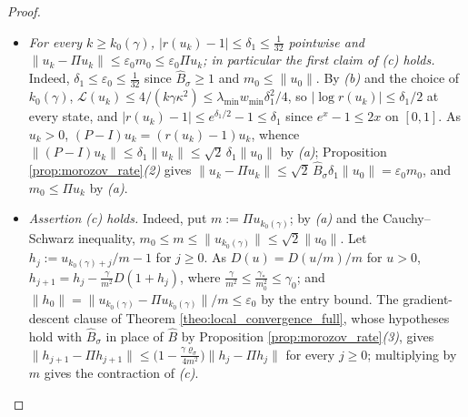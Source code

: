 \begin{proof}
\begin{itemize}
\begin{eqnarray*}
        \|D(u_k)\|\;\geq\;|\Pi D(u_k)|&=&\int\bigl|g'(r(u_k))\bigl(1-r(u_k)\bigr)\bigr|\,\frac w{u_k}\,d\lambda\\
        &\geq&\frac{w_{\min}}{M\max u_k}\int g(r(u_k))\,d\lambda\;\geq\;\frac\kappa{\sqrt2}\,\mathcal L(u_k).
    \end{eqnarray*}
    With \emph{(a)}, $\mathcal L(u_{k+1})\leq\mathcal L(u_k)\bigl(1-\frac{\gamma\kappa^2}4\mathcal L(u_k)\bigr)$. If $\mathcal L(u_{k+1})>0$, then $\frac{\gamma\kappa^2}4\mathcal L(u_k)<1$ and $\mathcal L(u_{k+1})^{-1}\geq\mathcal L(u_k)^{-1}\bigl(1-\frac{\gamma\kappa^2}4\mathcal L(u_k)\bigr)^{-1}\geq\mathcal L(u_k)^{-1}+\frac{\gamma\kappa^2}4$; if $\mathcal L(u_j)=0$, then $\mathcal L(u_k)=0$ for every $k\geq j$ by \emph{(a)}. Induction on $k$ gives \emph{(b)}.
    \item \emph{For every $k\geq k_0(\gamma)$, $|r(u_k)-1|\leq\delta_1\leq\frac1{32}$ pointwise and $\|u_k-\Pi u_k\|\leq\varepsilon_0m_0\leq\varepsilon_0\Pi u_k$; in particular the first claim of \emph{(c)} holds.} Indeed, $\delta_1\leq\varepsilon_0\leq\frac1{32}$ since $\widehat B_\sigma\geq1$ and $m_0\leq\|u_0\|$. By \emph{(b)} and the choice of $k_0(\gamma)$, $\mathcal L(u_k)\leq4/(k\gamma\kappa^2)\leq\lambda_{\min}w_{\min}\delta_1^2/4$, so $|\log r(u_k)|\leq\delta_1/2$ at every state, and $|r(u_k)-1|\leq e^{\delta_1/2}-1\leq\delta_1$ since $e^x-1\leq2x$ on $[0,1]$. As $u_k>0$, $(P-I)u_k=(r(u_k)-1)u_k$, whence $\|(P-I)u_k\|\leq\delta_1\|u_k\|\leq\sqrt2\,\delta_1\|u_0\|$ by \emph{(a)}; Proposition \ref{prop:morozov_rate}\emph{(2)} gives $\|u_k-\Pi u_k\|\leq\sqrt2\,\widehat B_\sigma\delta_1\|u_0\|=\varepsilon_0m_0$, and $m_0\leq\Pi u_k$ by \emph{(a)}.
    \item \emph{Assertion \emph{(c)} holds.} Indeed, put $m:=\Pi u_{k_0(\gamma)}$; by \emph{(a)} and the Cauchy--Schwarz inequality, $m_0\leq m\leq\|u_{k_0(\gamma)}\|\leq\sqrt2\|u_0\|$. Let $h_j:=u_{k_0(\gamma)+j}/m-1$ for $j\geq0$. As $D(u)=D(u/m)/m$ for $u>0$, $h_{j+1}=h_j-\frac\gamma{m^2}D(1+h_j)$, where $\frac\gamma{m^2}\leq\frac{\gamma_*}{m_0^2}\leq\gamma_0$; and $\|h_0\|=\|u_{k_0(\gamma)}-\Pi u_{k_0(\gamma)}\|/m\leq\varepsilon_0$ by the entry bound. The gradient-descent clause of Theorem \ref{theo:local_convergence_full}, whose hypotheses hold with $\widehat B_\sigma$ in place of $\widehat B$ by Proposition \ref{prop:morozov_rate}\emph{(3)}, gives $\|h_{j+1}-\Pi h_{j+1}\|\leq\bigl(1-\frac{\gamma\varrho_\sigma}{4m^2}\bigr)\|h_j-\Pi h_j\|$ for every $j\geq0$; multiplying by $m$ gives the contraction of \emph{(c)}.

\end{itemize}
\end{proof}
